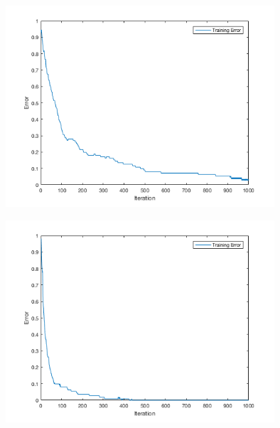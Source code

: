 \documentclass[12pt]{article}
\begin{document}


\begin{center}
  \begin{table}[H]
    \begin{varwidth}[b]{0.4\linewidth}
      \centering
      \label{table:NNYYN}
    \end{varwidth}%
    \hfill
    \begin{minipage}[b]{0.6\linewidth}
      \centering
      \includegraphics[width=100mm]{NNYYN_training_error.png}
      \label{fig:NNYYN}
    \end{minipage}
  \end{table}
\end{center}




\begin{center}
  \begin{table}[H]
    \begin{varwidth}[b]{0.4\linewidth}
      \centering
      \label{table:YYYNN}
    \end{varwidth}%
    \hfill
    \begin{minipage}[b]{0.6\linewidth}
      \centering
      \includegraphics[width=100mm]{YYYNN_training_error.png}
      \label{fig:YYYNN}
    \end{minipage}
  \end{table}
\end{center}
\end{document}
